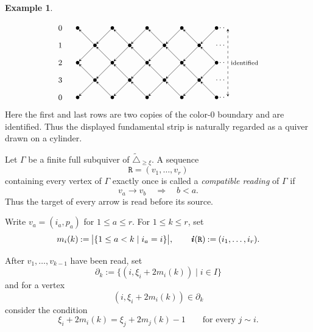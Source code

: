 \documentclass[12pt, leqno]{amsart}
\numberwithin{equation}{section}
\theoremstyle{plain}
\theoremstyle{definition}
\newtheorem{example}[lemma]{Example}
\newcommand{\seteq}{\mathbin{:=}}
\newcommand{\Dynkin}{\triangle}
\newcommand{\ii}{ \textbf{\textit{i}}}
\newcommand{\ttR}{\mathtt{R}}
\newcommand{\tDynkin}{{\widetilde{\Dynkin}}}
\begin{document}
\begin{example}
\begin{enumerate}[(i)]
\[\begin{tikzpicture}[
  x=0.72cm,
  y=0.72cm,
  baseline=(current bounding box.center),
  every node/.style={font=\small},
  vertex/.style={circle,fill=black,inner sep=1.45pt},
  arrow/.style={->,>=stealth,thin}
]
\node at (0,0)   {$0$};
\node at (0,-1)  {$1$};
\node at (0,-2)  {$2$};
\node at (0,-3)  {$3$};
\node at (0,-4)  {$0$};

\foreach \p in {1,3,5,7,9}{
  \node[vertex] (zt\p) at (\p,0) {};
  \node[vertex] (tw\p) at (\p,-2) {};
  \node[vertex] (zb\p) at (\p,-4) {};
}

\foreach \p in {2,4,6,8}{
  \node[vertex] (on\p) at (\p,-1) {};
  \node[vertex] (th\p) at (\p,-3) {};
}

\foreach \p/\pm/\pp in {2/1/3,4/3/5,6/5/7,8/7/9}{
  \draw[arrow] (on\p) -- (zt\pm);
  \draw[arrow] (zt\pp) -- (on\p);

  \draw[arrow] (on\p) -- (tw\pm);
  \draw[arrow] (tw\pp) -- (on\p);

  \draw[arrow] (th\p) -- (tw\pm);
  \draw[arrow] (tw\pp) -- (th\p);

  \draw[arrow] (th\p) -- (zb\pm);
  \draw[arrow] (zb\pp) -- (th\p);
}

\draw[<->,dashed,>=stealth]
  (9.65,-0.05)
  --
  node[right,align=left,font=\scriptsize]
  {identified}
  (9.65,-3.95);

\node at (9.25,0)  {$\cdots$};
\node at (9.25,-1) {$\cdots$};
\node at (9.25,-2) {$\cdots$};
\node at (9.25,-3) {$\cdots$};
\node at (9.25,-4) {$\cdots$};

\end{tikzpicture}
\]
Here the first and last rows are two copies of the color-\(0\)
boundary and are identified.  Thus the displayed fundamental strip
is naturally regarded as a quiver drawn on a cylinder.
\end{enumerate}
\end{example}
Let \(\Gamma\) be a finite full subquiver of
\(\tDynkin_{\geq\xi}\).  A sequence
\[
\ttR=(v_1,\ldots,v_r)
\]
containing every vertex of \(\Gamma\) exactly once is called a
\emph{compatible reading} of \(\Gamma\) if
\[
v_a\longrightarrow v_b \quad\Longrightarrow\quad b<a.
\]
Thus the target of every arrow is read before its source.

Write \(v_a=(i_a,p_a)\) for \(1\leq a\leq r\). For \(1\leq k\leq r\), set  
\[
m_i(k) \seteq \bigl|\{1\leq a<k\mid i_a=i\}\bigr|,
\qquad \ii(\ttR)\seteq(i_1,\ldots,i_r).
\]

After \(v_1,\ldots,v_{k-1}\) have been read, set  
\[
\partial_k \seteq \bigl\{ (i,\xi_i+2m_i(k)) \mid i\in I \bigr\}
\]
and for a vertex  
\[
(i,\xi_i+2m_i(k))\in\partial_k
\]
consider the condition 
\[
\xi_i+2m_i(k) = \xi_j+2m_j(k)-1
\qquad
\text{for every }j\sim i.
\]
\end{document}
